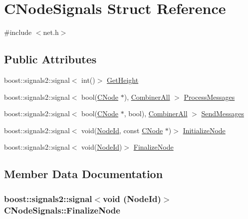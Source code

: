 \hypertarget{struct_c_node_signals}{}\section{C\+Node\+Signals Struct Reference}
\label{struct_c_node_signals}


{\ttfamily \#include $<$net.\+h$>$}

\subsection*{Public Attributes}
\begin{DoxyCompactItemize}
\item 
boost\+::signals2\+::signal$<$ int()$>$ \hyperlink{struct_c_node_signals_aa9f8b7c213d6c40be77242e8cbcf46e9}{Get\+Height}
\item 
boost\+::signals2\+::signal$<$ bool(\hyperlink{class_c_node}{C\+Node} $\ast$), \hyperlink{struct_combiner_all}{Combiner\+All} $>$ \hyperlink{struct_c_node_signals_add09b68af12ffb51821a3b8b3d6a197a}{Process\+Messages}
\item 
boost\+::signals2\+::signal$<$ bool(\hyperlink{class_c_node}{C\+Node} $\ast$, bool), \hyperlink{struct_combiner_all}{Combiner\+All} $>$ \hyperlink{struct_c_node_signals_afff724263ba16c56bedc90cac8548cb6}{Send\+Messages}
\item 
boost\+::signals2\+::signal$<$ void(\hyperlink{net_8h_a954d746a58632565552615fd0a4ee660}{Node\+Id}, const \hyperlink{class_c_node}{C\+Node} $\ast$)$>$ \hyperlink{struct_c_node_signals_a137e1854c9fea8a56e5f30be76da8b86}{Initialize\+Node}
\item 
boost\+::signals2\+::signal$<$ void(\hyperlink{net_8h_a954d746a58632565552615fd0a4ee660}{Node\+Id})$>$ \hyperlink{struct_c_node_signals_a4fb2ed0335cbfa8daf5f43a0b42ec481}{Finalize\+Node}
\end{DoxyCompactItemize}


\subsection{Member Data Documentation}
\hypertarget{struct_c_node_signals_a4fb2ed0335cbfa8daf5f43a0b42ec481}{}
\subsubsection[{Finalize\+Node}]{\setlength{\rightskip}{0pt plus 5cm}boost\+::signals2\+::signal$<$void ({\bf Node\+Id})$>$ C\+Node\+Signals\+::\+Finalize\+Node}\label{struct_c_node_signals_a4fb2ed0335cbfa8daf5f43a0b42ec481}
\hypertarget{struct_c_node_signals_aa9f8b7c213d6c40be77242e8cbcf46e9}{}
